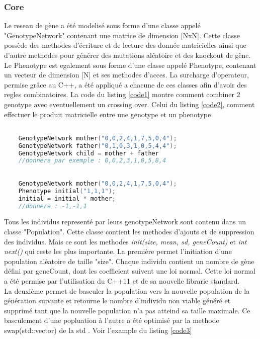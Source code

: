 \documentclass{article}
\begin{document}
	\subsubsection {Core}
	Le reseau de gène a été modelisé sous forme d'une classe appelé "GenotypeNetwork" contenant une matrice de dimension [NxN]. Cette classe possède des methodes d'écriture et de lecture des donnée matricielles ainsi que d'autre methodes pour générer des mutations aléatoire et des knockout de gène.
	Le Phenotype est egalement sous forme d'une classe appelé Phenotype, contenant un vecteur de dimension [N] et ses methodes d'acces. 
	La surcharge d'operateur, permise grâce au C++, a été appliqué a chacune de ces classes afin d'avoir des regles combinatoires. La code du listing \ref{code1} montre comment combiner 2 genotype avec eventuellement un crossing over.  Celui du listing \ref{code2}, comment effectuer le produit matricielle entre une genotype et un phenotype

	\begin{lstlisting}[language=C++, caption=Addition de genotype, label={code1}]

	GenotypeNetwork mother("0,0,2,4,1,7,5,0,4");
	GenotypeNetwork father("0,1,0,3,1,0,5,4,4");
	GenotypeNetwork child = mother + father
	//donnera par exemple : 0,0,2,3,1,0,5,8,4
	\end{lstlisting}

	\begin{lstlisting}[language=C++, caption=produit d'un genotype et d'un phenotype, label={code2}]

	GenotypeNetwork mother("0,0,2,4,1,7,5,0,4");
	Phenotype initial("1,1,1");
	initial = initial * mother;
	//donnera : -1,-1,1
	\end{lstlisting}

	Tous les individus representé par leurs genotypeNetwork sont contenu dans un classe "Population". Cette classe contient les methodes d'ajouts et de suppression des individus. Mais ce sont les methodes \emph{init(size, mean, sd, geneCount)} et \emph{int next()} qui reste les plus importante. La première permet l'initiation d'une population aléatoire de taille "size". Chaque individu contient un nombre de gène défini par geneCount, dont les coefficient suivent une loi normal. Cette loi normal a été permise par l'utilisation du C++11 et de sa nouvelle librarie standard. \\
	La deuxième permet de basculer la population vers la nouvelle population de la génération suivante et retourne le nombre d'individu non viable généré et supprimé tant que la nouvelle population n'a pas atteind sa taille maximale. Ce basculement d'une popluation à l'autre a été optimisé par la methode swap(std::vector) de la std
	. Voir l'example du listing \ref{code3} 
	\\
	\\
\end{document}
